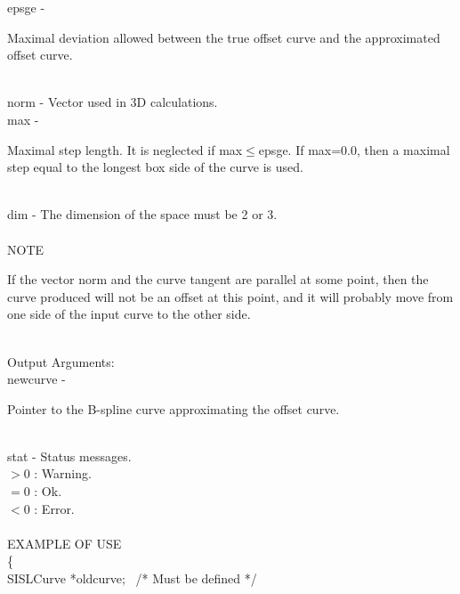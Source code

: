         \>\>    {\fov epsge}    \> - \> \begin{minipg2}
                        Maximal deviation allowed between the true offset
                        curve and the approximated offset curve.
                                \end{minipg2}\\[0.3ex]
        \>\>    {\fov norm}     \> - \> Vector used in 3D calculations.\\
        \>\>    {\fov max}      \> - \> \begin{minipg2}
                        Maximal step length. It is neglected if
                        max$\leq$epsge. If max=0.0, then a maximal step
                        equal to the longest box side of the curve is used.
                                \end{minipg2}\\[0.8ex]
        \>\>    {\fov dim}      \> - \>The dimension of the space must be 2 or 3.\\
\\
NOTE\\
\>\begin{minipg6}
  If the vector norm and the curve tangent are parallel at some point,
  then the curve produced will not be an offset at this point, and it
  will probably move from one side of the input curve to the other side.
\end{minipg6}\\
\newpagetabs
        \>Output Arguments:\\
        \>\>    {\fov newcurve}\> - \> \begin{minipg2}
                        Pointer to the B-spline curve
                        approximating the offset curve.
                                       \end{minipg2}\\[0.8ex]
        \>\>    {\fov stat}     \> - \> Status messages.\\
                \>\>\>\>\>              $> 0$   : Warning.\\
                \>\>\>\>\>              $= 0$   : Ok.\\
                \>\>\>\>\>              $< 0$   : Error.\\
\\
EXAMPLE OF USE\\
                \>      \{ \\
                \>\>    SISLCurve       \>      *{\fov oldcurve}; \, /* Must be defined */\\
